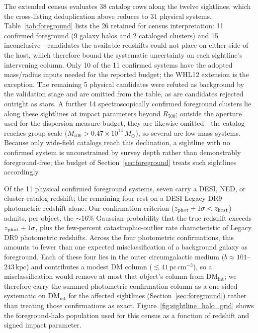 The extended census evaluates 38 catalog rows along the twelve sightlines,
which the cross-listing deduplication above reduces to 31 physical systems.
Table~\ref{tab:foreground} lists the 26 retained for census interpretation:
11 confirmed foreground (9 galaxy halos and 2 cataloged clusters) and
15 inconclusive---candidates the
available redshifts could not place on either side of the host, which
therefore bound the systematic uncertainty on each sightline's intervening
column. Only 10 of the 11 confirmed systems have the adopted mass/radius inputs
needed for the reported budget; the WHL12 extension is the exception. The
remaining 5 physical candidates were refuted as background by the
validation stage and are omitted from the table, as are candidates rejected
outright as stars. A further 14 spectroscopically confirmed
foreground clusters lie along these sightlines at impact parameters beyond
$R_{500}$; outside the aperture used for the dispersion-measure budget, they
are likewise omitted---the \citet{WenHan2024} catalog reaches group scale
($M_{500}>0.47\times10^{14}\,M_\odot$), so several are low-mass systems. Because
only wide-field catalogs reach this declination, a sightline with no confirmed
system is unconstrained by survey depth rather than demonstrably foreground-free;
the budget of Section~\ref{sec:foreground} treats such sightlines accordingly.

Of the 11 physical confirmed foreground systems, seven carry a DESI, NED, or
cluster-catalog redshift; the remaining four rest on a
DESI Legacy DR9 photometric redshift alone. Our confirmation criterion
($z_{\rm phot}+1\sigma < z_{\rm host}$) admits, per object, the $\sim16\%$
Gaussian probability that the true redshift exceeds $z_{\rm phot}+1\sigma$, plus
the few-percent catastrophic-outlier rate characteristic of Legacy DR9
photometric redshifts. Across the four photometric confirmations, this amounts
to fewer than one expected misclassification of a background galaxy as
foreground.
Each of these four lies in the outer circumgalactic medium
($b\approx101$--$243\,\mathrm{kpc}$) and contributes a modest DM
column ($\lesssim41\,\mathrm{pc\,cm^{-3}}$), so a misclassification would
remove at most that object's column from
$\mathrm{DM_{int}}$; we therefore carry the summed photometric-confirmation
column as a one-sided systematic on $\mathrm{DM_{int}}$ for the affected
sightlines (Section~\ref{sec:foreground}) rather than treating those
confirmations as exact.
Figure~\ref{fig:sightline_halo_grid} shows the foreground-halo population used
for this census as a function of redshift and signed impact parameter.

